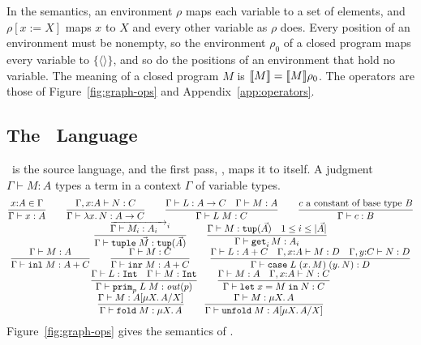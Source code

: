 In the semantics, an environment $\rho$ maps each variable to a set of
elements, and $\rho[x{:=}X]$ maps $x$ to $X$ and every other variable
as $\rho$ does. Every position of an environment must be nonempty, so
the environment $\rho_0$ of a closed program maps every variable to
$\{\langle\rangle\}$, and so do the positions of an environment that
hold no variable. The meaning of a closed program $M$ is
$\llbracket M \rrbracket = \llbracket M \rrbracket\rho_0$. The operators are those of
Figure~\ref{fig:graph-ops} and Appendix~\ref{app:operators}.

\subsection{The \fpc\ Language}

\fpc\ is the source language, and the first pass, , maps it to itself. A judgment $\Gamma \vdash M : A$ types a term in a context $\Gamma$ of variable types.
{\small\figdefs
{}
\[
\begin{array}{@{}c@{}}
  \dfrac{x{:}A \in \Gamma}{\Gamma \vdash x : A}
  \qquad
  \dfrac{\Gamma, x{:}A \vdash N : C}{\Gamma \vdash \lambda x.\, N : A \rightarrow C}
  \qquad
  \dfrac{\Gamma \vdash L : A \rightarrow C \quad \Gamma \vdash M : A}{\Gamma \vdash L\;M : C}
  \qquad
  \dfrac{c \text{ a constant of base type } B}{\Gamma \vdash c : B}
  \\[6pt]
  \dfrac{\overrightarrow{\Gamma \vdash M_i : A_i \quad}^{i}}
        {\Gamma \vdash \kw{tuple}\;\vec{M} : \kw{tup}(\vec{A})}
  \qquad
  \dfrac{\Gamma \vdash M : \kw{tup}(\vec{A}) \quad 1 \leq i \leq |\vec{A}|}
        {\Gamma \vdash \kw{get}_i\,M : A_i}
  \\[6pt]
  \dfrac{\Gamma \vdash M : A}{\Gamma \vdash \kw{inl}\;M : A + C}
  \qquad
  \dfrac{\Gamma \vdash M : C}{\Gamma \vdash \kw{inr}\;M : A + C}
  \qquad
  \dfrac{\Gamma \vdash L : A + C \quad \Gamma, x{:}A \vdash M : D \quad \Gamma, y{:}C \vdash N : D}
        {\Gamma \vdash \kw{case}\;L\;(x.\,M)\;(y.\,N) : D}
  \\[6pt]
  \dfrac{\Gamma \vdash L : \kw{Int} \quad \Gamma \vdash M : \kw{Int}}
        {\Gamma \vdash \kw{prim}_p\;L\;M : \mathit{out}(p)}
  \qquad
  \dfrac{\Gamma \vdash M : A \quad \Gamma, x{:}A \vdash N : C}
        {\Gamma \vdash \kw{let}\;x = M\;\kw{in}\;N : C}
  \\[6pt]
  \dfrac{\Gamma \vdash M : A[\mu X.\, A / X]}{\Gamma \vdash \kw{fold}\;M : \mu X.\, A}
  \qquad
  \dfrac{\Gamma \vdash M : \mu X.\, A}{\Gamma \vdash \kw{unfold}\;M : A[\mu X.\, A / X]}
\end{array}
\]
}
Figure~\ref{fig:graph-ops} gives the semantics of \fpc.

